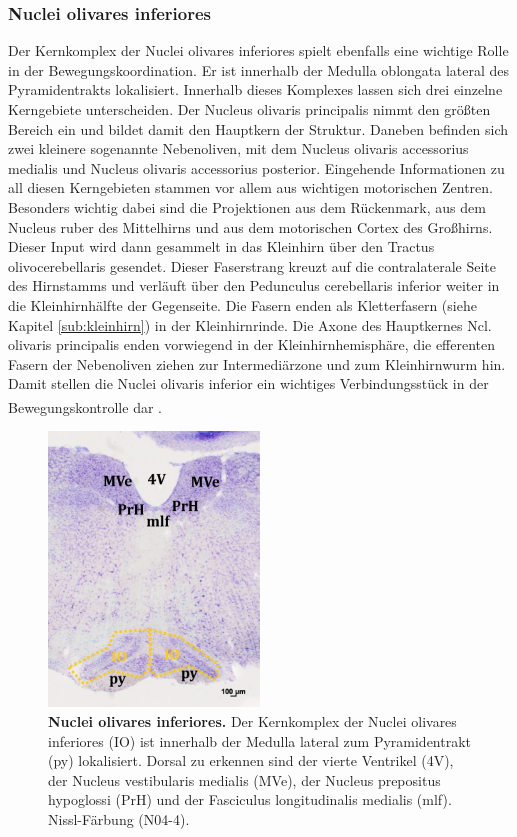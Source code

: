 \documentclass[12pt,a4paper,pdftex]{article}
\begin{document}
\subsubsection{Nuclei olivares inferiores}  
Der Kernkomplex der Nuclei olivares inferiores spielt ebenfalls eine wichtige Rolle in der Bewegungskoordination. Er ist innerhalb der Medulla oblongata lateral des Pyramidentrakts lokalisiert. Innerhalb dieses Komplexes lassen sich drei einzelne Kerngebiete unterscheiden. Der Nucleus olivaris principalis nimmt den größten Bereich ein und bildet damit den Hauptkern der Struktur. Daneben befinden sich zwei kleinere sogenannte Nebenoliven, mit dem Nucleus olivaris accessorius medialis und Nucleus olivaris accessorius posterior. Eingehende Informationen zu all diesen Kerngebieten stammen vor allem aus wichtigen motorischen Zentren. Besonders wichtig dabei sind die Projektionen aus dem Rückenmark, aus dem Nucleus ruber des Mittelhirns und aus dem motorischen Cortex des Großhirns. Dieser Input wird dann gesammelt in das Kleinhirn über den Tractus olivocerebellaris gesendet. Dieser Faserstrang kreuzt auf die contralaterale Seite des Hirnstamms und verläuft über den Pedunculus cerebellaris inferior weiter in die Kleinhirnhälfte der Gegenseite. Die Fasern enden als Kletterfasern (siehe Kapitel \ref{sub:kleinhirn}) in der Kleinhirnrinde. Die Axone des Hauptkernes Ncl. olivaris principalis enden vorwiegend in der Kleinhirnhemisphäre, die efferenten Fasern der Nebenoliven ziehen zur Intermediärzone und zum Kleinhirnwurm hin. Damit stellen die Nuclei olivaris inferior ein wichtiges Verbindungsstück in der Bewegungskontrolle dar \textsuperscript{\cite[5]{trepel2011neuroanatomie}}.    

\begin{figure}[H]
    \centering
    \includegraphics[width=0.5\textwidth]{pictures/Bilder_Laura/untere_olive_N04_4.png}
    \caption[Nuclei olivares inferiores]{\textbf{Nuclei olivares inferiores.} Der Kernkomplex der Nuclei olivares inferiores (IO) ist innerhalb der Medulla lateral zum Pyramidentrakt (py) lokalisiert. Dorsal zu erkennen sind der vierte Ventrikel (4V), der Nucleus vestibularis medialis (MVe), der Nucleus prepositus hypoglossi (PrH) und der Fasciculus longitudinalis medialis (mlf). Nissl-Färbung (N04-4).}
    \label{fig:untere_olive}
\end{figure}
\end{document}
